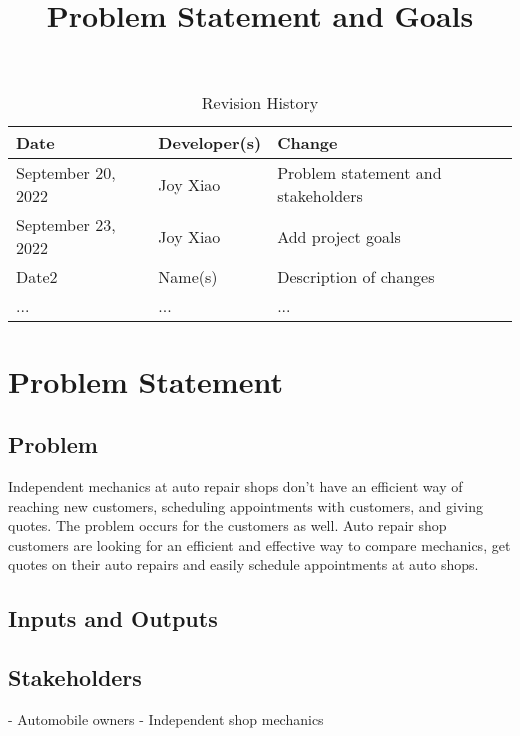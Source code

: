 \documentclass{article}
\title{Problem Statement and Goals\\\progname}
\author{\authname}
\date{}
\begin{document}
\maketitle

\begin{table}[hp]
\caption{Revision History} \label{TblRevisionHistory}
\begin{tabularx}{\textwidth}{llX}
\toprule
\textbf{Date} & \textbf{Developer(s)} & \textbf{Change}\\
\midrule
September 20, 2022 & Joy Xiao & Problem statement and stakeholders\\
September 23, 2022 & Joy Xiao & Add project goals\\
Date2 & Name(s) & Description of changes\\
... & ... & ...\\
\bottomrule
\end{tabularx}
\end{table}

\section{Problem Statement}


\subsection{Problem}
Independent mechanics at auto repair shops don't have an efficient way of reaching new customers, scheduling appointments with customers, and giving quotes. The problem occurs for the customers as well. Auto repair shop customers are looking for an efficient and effective way to compare mechanics, get quotes on their auto repairs and easily schedule appointments at auto shops.

\subsection{Inputs and Outputs}


\subsection{Stakeholders}
- Automobile owners
- Independent shop mechanics
\end{document}
